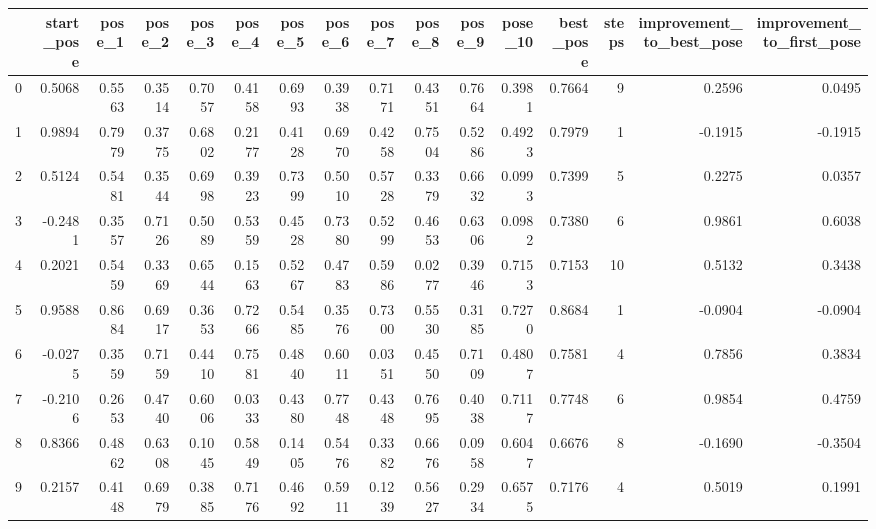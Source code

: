 \begin{tabular}{lrrrrrrrrrrrrrrr}
\toprule
{} &  start\_pose &  pose\_1 &  pose\_2 &  pose\_3 &  pose\_4 &  pose\_5 &  pose\_6 &  pose\_7 &  pose\_8 &  pose\_9 &  pose\_10 &  best\_pose &  steps &  improvement\_to\_best\_pose &  improvement\_to\_first\_pose \\
\midrule
0 &      0.5068 &  0.5563 &  0.3514 &  0.7057 &  0.4158 &  0.6993 &  0.3938 &  0.7171 &  0.4351 &  0.7664 &   0.3981 &     0.7664 &      9 &                    0.2596 &                     0.0495 \\
1 &      0.9894 &  0.7979 &  0.3775 &  0.6802 &  0.2177 &  0.4128 &  0.6970 &  0.4258 &  0.7504 &  0.5286 &   0.4923 &     0.7979 &      1 &                   -0.1915 &                    -0.1915 \\
2 &      0.5124 &  0.5481 &  0.3544 &  0.6998 &  0.3923 &  0.7399 &  0.5010 &  0.5728 &  0.3379 &  0.6632 &   0.0993 &     0.7399 &      5 &                    0.2275 &                     0.0357 \\
3 &     -0.2481 &  0.3557 &  0.7126 &  0.5089 &  0.5359 &  0.4528 &  0.7380 &  0.5299 &  0.4653 &  0.6306 &   0.0982 &     0.7380 &      6 &                    0.9861 &                     0.6038 \\
4 &      0.2021 &  0.5459 &  0.3369 &  0.6544 &  0.1563 &  0.5267 &  0.4783 &  0.5986 &  0.0277 &  0.3946 &   0.7153 &     0.7153 &     10 &                    0.5132 &                     0.3438 \\
5 &      0.9588 &  0.8684 &  0.6917 &  0.3653 &  0.7266 &  0.5485 &  0.3576 &  0.7300 &  0.5530 &  0.3185 &   0.7270 &     0.8684 &      1 &                   -0.0904 &                    -0.0904 \\
6 &     -0.0275 &  0.3559 &  0.7159 &  0.4410 &  0.7581 &  0.4840 &  0.6011 &  0.0351 &  0.4550 &  0.7109 &   0.4807 &     0.7581 &      4 &                    0.7856 &                     0.3834 \\
7 &     -0.2106 &  0.2653 &  0.4740 &  0.6006 &  0.0333 &  0.4380 &  0.7748 &  0.4348 &  0.7695 &  0.4038 &   0.7117 &     0.7748 &      6 &                    0.9854 &                     0.4759 \\
8 &      0.8366 &  0.4862 &  0.6308 &  0.1045 &  0.5849 &  0.1405 &  0.5476 &  0.3382 &  0.6676 &  0.0958 &   0.6047 &     0.6676 &      8 &                   -0.1690 &                    -0.3504 \\
9 &      0.2157 &  0.4148 &  0.6979 &  0.3885 &  0.7176 &  0.4692 &  0.5911 &  0.1239 &  0.5627 &  0.2934 &   0.6575 &     0.7176 &      4 &                    0.5019 &                     0.1991 \\
\bottomrule
\end{tabular}
